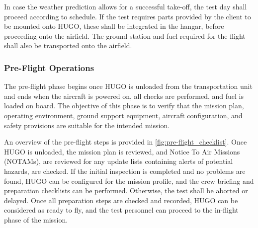 In case the weather prediction allows for a successful take-off, the test day shall proceed according to schedule. If the test requires parts provided by the client to be mounted onto HUGO, these shall be integrated in the hangar, before proceeding onto the airfield. The ground station and fuel required for the flight shall also be transported onto the airfield.

\subsubsection{Pre-Flight Operations}
The pre-flight phase begins once HUGO is unloaded from the transportation unit and ends when the aircraft is powered on, all checks are performed, and fuel is loaded on board. The objective of this phase is to verify that the mission plan, operating environment, ground support equipment, aircraft configuration, and safety provisions are suitable for the intended mission.

An overview of the pre-flight steps is provided in \autoref{fig:pre-flight_checklist}. Once HUGO is unloaded, the mission plan is reviewed, and Notice To Air Missions (NOTAMs), are reviewed for any update lists containing alerts of potential hazards, are checked. If the initial inspection is completed and no problems are found, HUGO can be configured for the mission profile, and the crew briefing and preparation checklists can be performed. Otherwise, the test shall be aborted or delayed. Once all preparation steps are checked and recorded, HUGO can be considered as ready to fly, and the test personnel can proceed to the in-flight phase of the mission.


